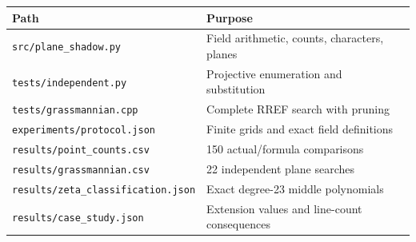 \documentclass[11pt]{article}
\theoremstyle{remark}\newtheorem{remark}[theorem]{Remark}
\begin{document}
\begin{center}\small
\begin{tabular}{ll}\toprule
Path&Purpose\\\midrule
\texttt{src/plane\_shadow.py}&Field arithmetic, counts, characters, planes\\
\texttt{tests/independent.py}&Projective enumeration and substitution\\
\texttt{tests/grassmannian.cpp}&Complete RREF search with pruning\\
\texttt{experiments/protocol.json}&Finite grids and exact field definitions\\
\texttt{results/point\_counts.csv}&150 actual/formula comparisons\\
\texttt{results/grassmannian.csv}&22 independent plane searches\\
\texttt{results/zeta\_classification.json}&Exact degree-23 middle polynomials\\
\texttt{results/case\_study.json}&Extension values and line-count consequences\\\bottomrule
\end{tabular}
\end{center}
\end{document}
